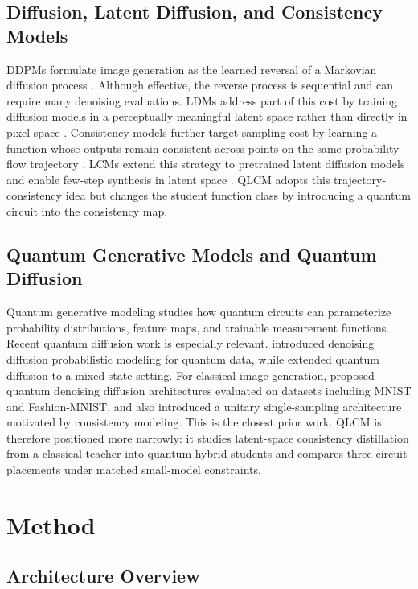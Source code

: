 \documentclass[11pt]{article}
\begin{document}
\subsection{Diffusion, Latent Diffusion, and Consistency Models}

DDPMs formulate image generation as the learned reversal of a Markovian
diffusion process \citep{ho2020ddpm}. Although effective, the reverse process is
sequential and can require many denoising evaluations. LDMs address part of this
cost by training diffusion models in a perceptually meaningful latent space
rather than directly in pixel space \citep{rombach2022ldm}. Consistency models
further target sampling cost by learning a function whose outputs remain
consistent across points on the same probability-flow trajectory
\citep{song2023consistency}. LCMs extend this strategy to pretrained latent
diffusion models and enable few-step synthesis in latent space
\citep{luo2023lcm}. QLCM adopts this trajectory-consistency idea but changes the
student function class by introducing a quantum circuit into the consistency
map.

\subsection{Quantum Generative Models and Quantum Diffusion}

Quantum generative modeling studies how quantum circuits can parameterize
probability distributions, feature maps, and trainable measurement functions.
Recent quantum diffusion work is especially relevant. \citet{zhang2023quddpm}
introduced denoising diffusion probabilistic modeling for quantum data, while
\citet{kwun2024mixedquddpm} extended quantum diffusion to a mixed-state setting.
For classical image generation, \citet{kolle2024qddm} proposed quantum denoising
diffusion architectures evaluated on datasets including MNIST and
Fashion-MNIST, and also introduced a unitary single-sampling architecture
motivated by consistency modeling. This is the closest prior work. QLCM is
therefore positioned more narrowly: it studies latent-space consistency
distillation from a classical teacher into quantum-hybrid students and compares
three circuit placements under matched small-model constraints.

\section{Method}

\subsection{Architecture Overview}
\end{document}

